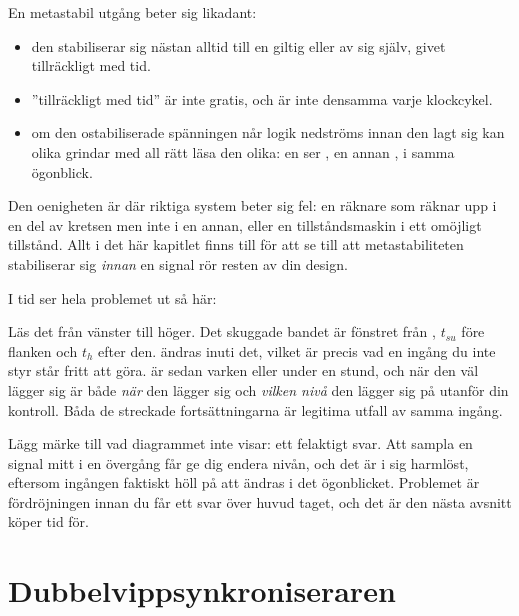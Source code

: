 En metastabil utgång beter sig likadant:
\begin{itemize}
  \item den stabiliserar sig nästan alltid till en giltig  eller  av sig själv,
    givet tillräckligt med tid.
  \item ”tillräckligt med tid” är inte gratis, och är inte densamma varje klockcykel.
  \item om den ostabiliserade spänningen når logik nedströms innan den lagt sig kan olika grindar
    med all rätt läsa den olika: en ser , en annan , i samma ögonblick.
\end{itemize}

Den oenigheten är där riktiga system beter sig fel: en räknare som räknar upp i en del av kretsen
men inte i en annan, eller en tillståndsmaskin i ett omöjligt tillstånd. Allt i det här kapitlet
finns till för att se till att metastabiliteten stabiliserar sig \emph{innan} en signal rör resten
av din design.

I tid ser hela problemet ut så här:


Läs det från vänster till höger. Det skuggade bandet är fönstret från ,
$t_{su}$ före flanken och $t_h$ efter den.  ändras inuti det, vilket är precis vad en
ingång du inte styr står fritt att göra.  är sedan varken  eller  under en
stund, och när den väl lägger sig är både \emph{när} den lägger sig och \emph{vilken nivå} den
lägger sig på utanför din kontroll. Båda de streckade fortsättningarna är legitima utfall av samma
ingång.

Lägg märke till vad diagrammet inte visar: ett felaktigt svar. Att sampla en signal mitt i en
övergång får ge dig endera nivån, och det är i sig harmlöst, eftersom ingången faktiskt höll på att
ändras i det ögonblicket. Problemet är fördröjningen innan du får ett svar över huvud taget, och
det är den nästa avsnitt köper tid för.

\section{Dubbelvippsynkroniseraren}
\label{c4:sec:sync}

